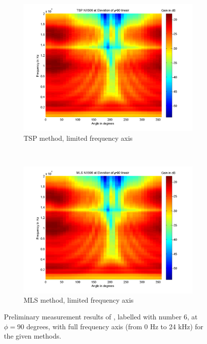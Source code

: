 \begin{figure}[b!]
        \begin{subfigure}[t]{0.5\textwidth}
                \centering
			    
    			\includegraphics[width=\textwidth]{afbeeldingen/plots/NX506_TSP_090_lin.png}
    			\caption{TSP method, limited frequency axis}
			    \label{fig:prelim:NX506_TSP_090}
        \end{subfigure}~        
        \begin{subfigure}[t]{0.5\textwidth}
                \centering
			    
    			\includegraphics[width=\textwidth]{afbeeldingen/plots/NX506_MLS_090_lin.png}
    			\caption{MLS method, limited frequency axis}
			    \label{fig:prelim:NX506_MLS_090}
        \end{subfigure}
        
        \caption[Preliminary measurement results {\nexus} (6)]{Preliminary measurement results of {\nexus}, labelled with number 6, at $\phi=90$ degrees, with full frequency axis (from 0 Hz to 24 kHz) for the given methods.}
        \label{fig:prelim:NX506_090}
\end{figure}